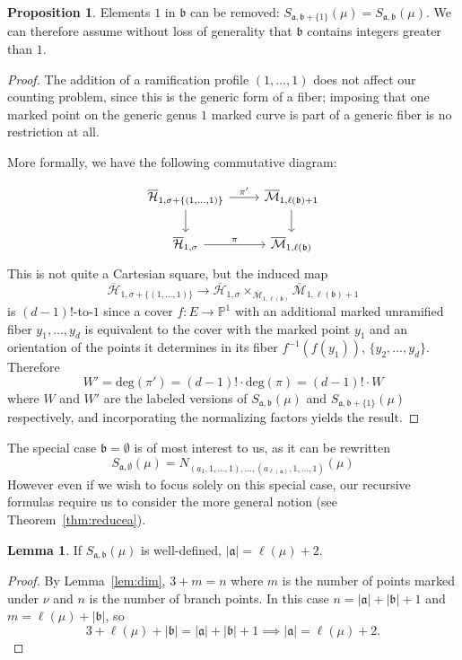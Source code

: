 \documentclass[thesis]{thesis-umich}           %
\newcommand{\Hb}{\overline{\mathcal H}}
\renewcommand{\a}{\mathfrak a}
\renewcommand{\b}{\mathfrak b}
\renewcommand{\P}{\mathbb P}
\theoremstyle{definition}
\newtheorem{prop}[thm]{Proposition}
\newtheorem{lem}[thm]{Lemma}
\begin{document}
\begin{prop}
  Elements $1$ in $\b$ can be removed:
  $S_{\a,\b+\{1\}}(\mu)=S_{\a,\b}(\mu)$.
  We can therefore assume without loss of generality that $\b$ contains integers greater than $1$.
\end{prop}
\begin{proof}
  The addition of a ramification profile $(1,\dots,1)$ does not affect
  our counting problem, since this is the generic form of a fiber;
  imposing that one marked point on the
  generic genus $1$
  marked curve is part of a generic fiber is no restriction at all.

  More formally,
  we have the following commutative diagram:

  \[\begin{tikzcd}
\Hb_{1,\sigma+\{(1,\dots,1)\}} & \overline{\mathcal M}_{1,\ell(\b)+1} \\
\Hb_{1,\sigma} & \overline{\mathcal M}_{1,\ell(\b)}
	\arrow[from=1-1, to=1-2, "\pi'"]
	\arrow[from=1-1, to=2-1]
	\arrow[from=1-2, to=2-2]
	\arrow[from=2-1, to=2-2, "\pi"]
  \end{tikzcd}\]
  This is not quite a Cartesian square, but the induced map
  \[\Hb_{1,\sigma+\{(1,\dots,1)\}}\to \Hb_{1,\sigma}\times_{\overline{\mathcal M}_{1,\ell(\b)}}\overline{\mathcal M}_{1,\ell(\b)+1}
  \]
  is $(d-1)!$-to-$1$ since a cover $f:E\to\P^1$ with an additional marked unramified fiber
  $y_1,\dots,y_d$
  is equivalent to the cover with the marked point $y_1$ and an orientation
  of the points it determines in its fiber $f^{-1}(f(y_1))$, $\{y_2,\dots,y_d\}$.
  Therefore
  \[
  W'=\text{deg}(\pi')=(d-1)!\cdot\text{deg}(\pi)=(d-1)!\cdot W
  \]
  where $W$ and $W'$ are the labeled versions of $S_{\a,\b}(\mu)$ and
  $S_{\a,\b+\{1\}}(\mu)$ respectively, and incorporating the normalizing factors
  yields the result.
  \end{proof}

The special case $\b=\emptyset$ is of most interest to us, as it can be rewritten
\[
S_{\a,\emptyset}(\mu)=N_{(a_1,1,\dots,1),\dots,(a_{\ell(\a)},1,\dots,1)}(\mu)
\]
However even if we wish to focus solely on this special case, our
recursive formulas require us to consider the more general notion (see
Theorem~\ref{thm:reducea}).



\begin{lem}
  \label{lem:Sabdim}
  If $S_{\mathfrak a,\mathfrak b}(\mu)$ is well-defined, $|\mathfrak a|=\ell(\mu)+2$.
\end{lem}
\begin{proof}
  By Lemma~\ref{lem:dim}, $3+m=n$ where $m$ is the number of points marked under $\nu$ and
  $n$ is the number of branch points. In this case $n=|\mathfrak a|+|\mathfrak b|+1$
  and $m=\ell(\mu)+|\mathfrak b|$, so
  \[
  3+\ell(\mu)+|\mathfrak b|=|\mathfrak a|+|\mathfrak b|+1\implies |\mathfrak a|=\ell(\mu)+2.
  \]
\end{proof}
\end{document}
